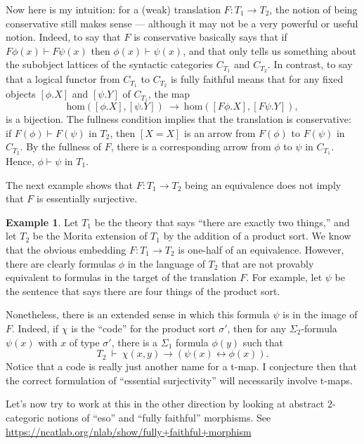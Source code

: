 \documentclass[12pt]{article}
\theoremstyle{definition}
\newtheorem{example}[prop]{Example}
\theoremstyle{remark}
\newcommand{\3}{\mathcal}
\begin{document}
Now here is my intuition: for a (weak) translation $F:T_1\to T_2$, the
notion of being conservative still makes sense --- although it may not
be a very powerful or useful notion. Indeed, to say that $F$ is
conservative basically says that if $F\phi (x)\vdash F\psi (x)$ then
$\phi (x)\vdash\psi (x)$, and that only tells us something about the
subobject lattices of the syntactic categories $C_{T_1}$ and
$C_{T_2}$. In contrast, to say that a logical functor from $C_{T_1}$
to $C_{T_2}$ is fully faithful means that for any fixed objects
$[\phi .X]$ and $[\psi .Y]$ of $C_{T_1}$, the map
\[ \mathrm{hom}\left( [\phi .X] ,[\psi .Y]\right) \: \to \:
  \mathrm{hom}\left( [F\phi .X] ,[F\psi .Y]\right) ,\] is a
bijection. The fullness condition implies that the translation is
conservative: if $F(\phi )\vdash F(\psi )$ in $T_2$, then $[X=X]$ is
an arrow from $F(\phi )$ to $F(\psi )$ in $C_{T_2}$. By the fullness
of $F$, there is a corresponding arrow from $\phi$ to $\psi$ in
$C_{T_1}$. Hence, $\phi\vdash\psi$ in $T_1$.

The next example shows that $F:T_1\to T_2$ being an equivalence does
not imply that $F$ is essentially surjective.

\begin{example} Let $T_1$ be the theory that says ``there are exactly
  two things,'' and let $T_2$ be the Morita extension of $T_1$ by the
  addition of a product sort. We know that the obvious embedding
  $F:T_1\to T_2$ is one-half of an equivalence. However, there are
  clearly formulas $\phi$ in the language of $T_2$ that are not
  provably equivalent to formulas in the target of the translation
  $F$. For example, let $\psi$ be the sentence that says there are
  four things of the product sort.

  Nonetheless, there is an extended sense in which this formula $\psi$
  is in the image of $F$. Indeed, if $\chi$ is the ``code'' for the
  product sort $\sigma '$, then for any $\Sigma _2$-formula $\psi (x)$
  with $x$ of type $\sigma '$, there is a $\Sigma _1$ formula
  $\phi (y)$ such that
  \[ T_2\: \vdash \: \chi (x,y)\to (\psi (x)\leftrightarrow \phi (x))
    .\] Notice that a code is really just another name for a t-map. I
  conjecture then that the correct formulation of ``essential
  surjectivity'' will necessarily involve t-maps. \end{example}

Let's now try to work at this in the other direction by looking at
abstract $2$-categoric notions of ``eso'' and ``fully faithful''
morphisms. See
\url{https://ncatlab.org/nlab/show/fully+faithful+morphism}
\end{document}
